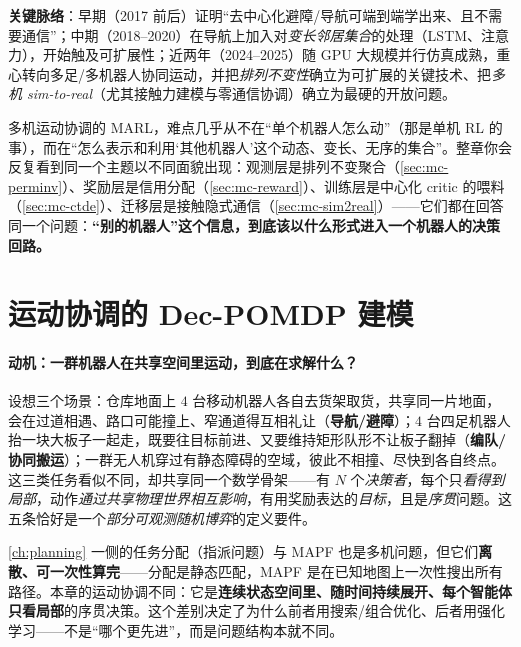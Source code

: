 \noindent\textbf{关键脉络}：早期（2017 前后）证明“去中心化避障/导航可端到端学出来、且不需要通信”；中期（2018--2020）在导航上加入对\emph{变长邻居集合}的处理（LSTM、注意力），开始触及可扩展性；近两年（2024--2025）随 GPU 大规模并行仿真成熟，重心转向多足/多机器人协同运动，并把\emph{排列不变性}确立为可扩展的关键技术、把\emph{多机 sim-to-real}（尤其接触力建模与零通信协调）确立为最硬的开放问题。

\begin{insight}[整章的统一主题]
多机运动协调的 MARL，难点几乎从不在“单个机器人怎么动”（那是单机 RL 的事），而在“怎么表示和利用‘其他机器人’这个动态、变长、无序的集合”。整章你会反复看到同一个主题以不同面貌出现：观测层是排列不变聚合（\cref{sec:mc-perminv}）、奖励层是信用分配（\cref{sec:mc-reward}）、训练层是中心化 critic 的喂料（\cref{sec:mc-ctde}）、迁移层是接触隐式通信（\cref{sec:mc-sim2real}）——它们都在回答同一个问题：\textbf{“别的机器人”这个信息，到底该以什么形式进入一个机器人的决策回路。}
\end{insight}

\section{运动协调的 Dec-POMDP 建模}
\label{sec:mc-decpomdp}

\paragraph{动机：一群机器人在共享空间里运动，到底在求解什么？}
设想三个场景：仓库地面上 $4$ 台移动机器人各自去货架取货，共享同一片地面，会在过道相遇、路口可能撞上、窄通道得互相礼让（\textbf{导航/避障}）；$4$ 台四足机器人抬一块大板子一起走，既要往目标前进、又要维持矩形队形不让板子翻掉（\textbf{编队/协同搬运}）；一群无人机穿过有静态障碍的空域，彼此不相撞、尽快到各自终点。这三类任务看似不同，却共享同一个数学骨架——有 $N$ 个\emph{决策者}，每个只\emph{看得到局部}，动作\emph{通过共享物理世界相互影响}，有用奖励表达的\emph{目标}，且是\emph{序贯}问题。这五条恰好是一个\emph{部分可观测随机博弈}的定义要件。

\begin{insight}[与离散多机问题的本质区别]
\cref{ch:planning} 一侧的任务分配（指派问题）与 MAPF 也是多机问题，但它们\textbf{离散、可一次性算完}——分配是静态匹配，MAPF 是在已知地图上一次性搜出所有路径。本章的运动协调不同：它是\textbf{连续状态空间里、随时间持续展开、每个智能体只看局部}的序贯决策。这个差别决定了为什么前者用搜索/组合优化、后者用强化学习——不是“哪个更先进”，而是问题结构本就不同。
\end{insight}

